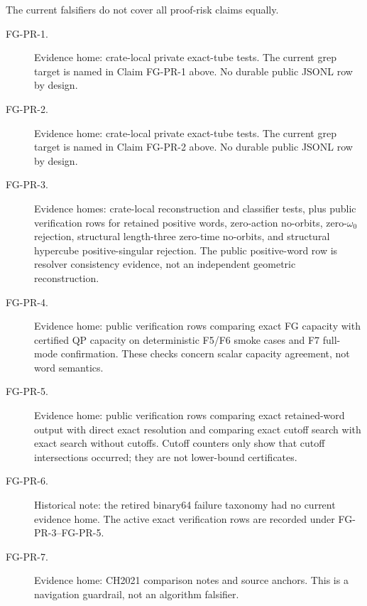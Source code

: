 \begin{remark}\label{rem:fg-pr-evidence-coverage}
The current falsifiers do not cover all proof-risk claims equally.
\begin{description}
  \item[FG-PR-1.]
    Evidence home: crate-local private exact-tube tests.  The current grep
    target is named in Claim FG-PR-1 above.  No durable public JSONL row by
    design.
  \item[FG-PR-2.]
    Evidence home: crate-local private exact-tube tests.  The current grep
    target is named in Claim FG-PR-2 above.  No durable public JSONL row by
    design.
  \item[FG-PR-3.]
    Evidence homes: crate-local reconstruction and classifier tests, plus
    public verification rows for retained positive words, zero-action no-orbits,
    zero-\(\omega_0\) rejection, structural length-three zero-time no-orbits,
    and structural hypercube positive-singular rejection.  The public
    positive-word row is resolver consistency evidence, not an independent
    geometric reconstruction.
  \item[FG-PR-4.]
    Evidence home: public verification rows comparing exact FG capacity with
    certified QP capacity on deterministic F5/F6 smoke cases and F7 full-mode
    confirmation.  These checks concern scalar capacity agreement, not word
    semantics.
  \item[FG-PR-5.]
    Evidence home: public verification rows comparing exact retained-word
    output with direct exact resolution and comparing exact cutoff search with
    exact search without cutoffs.  Cutoff counters only show that cutoff
    intersections occurred; they are not lower-bound certificates.
  \item[FG-PR-6.]
    Historical note: the retired binary64 failure taxonomy had no current
    evidence home. The active exact verification rows are recorded under
    FG-PR-3--FG-PR-5.
  \item[FG-PR-7.]
    Evidence home: CH2021 comparison notes and source anchors.  This is a
    navigation guardrail, not an algorithm falsifier.
\end{description}
\end{remark}
